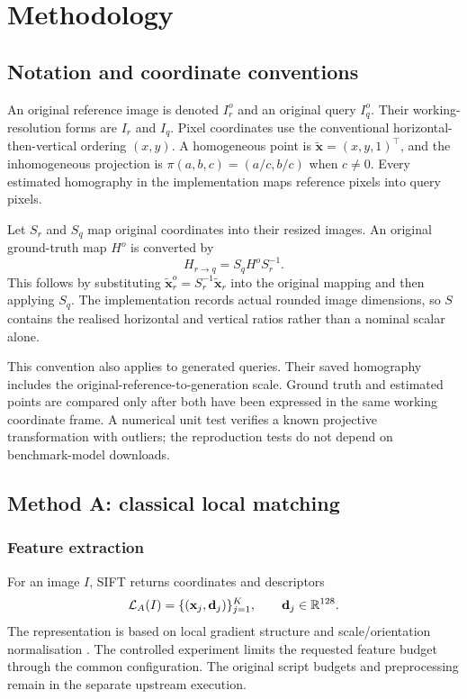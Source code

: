\chapter{Methodology}\label{ch:methodology}
\section{Notation and coordinate conventions}
An original reference image is denoted $I_r^o$ and an original query $I_q^o$. Their working-resolution forms are $I_r$ and $I_q$. Pixel coordinates use the conventional horizontal-then-vertical ordering $(x,y)$. A homogeneous point is $\widetilde{\mathbf x}=(x,y,1)^\top$, and the inhomogeneous projection is $\pi(a,b,c)=(a/c,b/c)$ when $c\neq0$. Every estimated homography in the implementation maps reference pixels into query pixels.

Let $S_r$ and $S_q$ map original coordinates into their resized images. An original ground-truth map $H^o$ is converted by
\begin{equation}\label{eq:resize-h}
 H_{r\rightarrow q}=S_q H^o S_r^{-1}.
\end{equation}
This follows by substituting $\widetilde{\mathbf x}_r^o=S_r^{-1}\widetilde{\mathbf x}_r$ into the original mapping and then applying $S_q$. The implementation records actual rounded image dimensions, so $S$ contains the realised horizontal and vertical ratios rather than a nominal scalar alone.

This convention also applies to generated queries. Their saved homography includes the original-reference-to-generation scale. Ground truth and estimated points are compared only after both have been expressed in the same working coordinate frame. A numerical unit test verifies a known projective transformation with outliers; the reproduction tests do not depend on benchmark-model downloads.

\section{Method A: classical local matching}
\subsection{Feature extraction}
For an image $I$, SIFT returns coordinates and descriptors
\begin{equation}
 \mathcal L_A(I)=\{(\mathbf x_j,\mathbf d_j)\}_{j=1}^{K},\qquad
 \mathbf d_j\in\mathbb{R}^{128}.
\end{equation}
The representation is based on local gradient structure and scale/orientation normalisation \citep{lowe2004}. The controlled experiment limits the requested feature budget through the common configuration. The original script budgets and preprocessing remain in the separate upstream execution.

